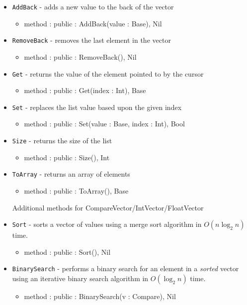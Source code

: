 \documentclass[12pt]{article}
\begin{document}
\begin{itemize}
\item \texttt{AddBack} - adds a new value to the back of the vector
  \begin{itemize}
  \item method : public : AddBack(value : Base), Nil
  \end{itemize} 
\item \texttt{RemoveBack} - removes the last element in the vector
  \begin{itemize}
  \item method : public : RemoveBack(), Nil
  \end{itemize}
\item \texttt{Get} - returns the value of the element  pointed to by the cursor
  \begin{itemize}
  \item method : public : Get(index : Int), Base
  \end{itemize}
\item \texttt{Set} - replaces the list value based upon the given index
  \begin{itemize}
  \item method : public : Set(value : Base, index : Int), Bool
  \end{itemize}
\item \texttt{Size} - returns the size of the list
  \begin{itemize}
  \item method : public : Size(), Int
  \end{itemize}
\item \texttt{ToArray} - returns an array of elements
  \begin{itemize}
  \item method : public : ToArray(), Base
  \end{itemize}
  Additional methods for CompareVector/IntVector/FloatVector
\item \texttt{Sort} - sorts a vector of values using a merge sort algorithm in $O(n \log_2 n)$ time.
  \begin{itemize}
  \item method : public : Sort(), Nil
  \end{itemize}
\item \texttt{BinarySearch} - performs a binary search for an element in a \emph{sorted} vector using an iterative binary search algorithm in $O(\log_2 n)$ time.
  \begin{itemize}
  \item method : public : BinarySearch(v : Compare), Nil
  \end{itemize}

\end{itemize}
\end{document}
